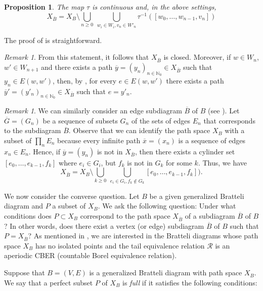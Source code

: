 \documentclass[11pt,reqno]{amsart}
\theoremstyle{definition}
\theoremstyle{remark}
\newtheorem{remark}[definition]{Remark}
\theoremstyle{plain}
\newtheorem{prop}[definition]{Proposition}
\def\ol{\overline}
\newcommand{\N}{\mathbb N}
\numberwithin{equation}{section}
\begin{document}
\begin{prop} \label{prop path space sbdgrm}
The map $\tau$ is continuous and, in the above settings,
$$
X_{\ol B} = X_B \setminus  \bigcup_{n \geq 0} \ 
\bigcup_{w_i \in W_i, v_n \in W'_n } \tau^{-1}( [w_0, \ldots, w_{n-1}, v_n]) 
$$
\end{prop}

The proof of  is straightforward.

\begin{remark}
 From this statement, it follows that $X_{\ol B}$ is closed. Moreover, if $w \in W_n$, $w' \in W_{n+1}$ and there exists a path $\ol y = (y_n)_{n \in \N_0} \in X_{\ol B}$ such that $y_n \in E(w, w')$, then, by , for every $e \in E(w, w')$ there exists a path $\ol y' = (y'_n)_{n \in \N_0} \in X_{\ol B}$ such that $e = y'_n$. 
\end{remark}

\begin{remark} We can similarly consider an edge subdiagram $\ol B$ of $B$ (see ). Let $\ol G = (G_n)$ be a sequence of subsets $G_n$ of the sets of
edges $E_n$ that corresponds to the subdiagram $\ol B$. Observe that we can identify the path space $X_B$ with a subset 
of $\prod_n E_n$ because every infinite path $\ol x = (x_n)$
is a sequence of edges $x_n \in E_n$. Hence, if $\ol y = (y_n)$ 
is not in 
$X_{\ol B}$, then there exists a cylinder set $[e_0, \ldots, e_{k-1}, f_k]$ where $e_i \in G_i$, but $f_k$ is not in $G_k$ for some $k$. 
Thus, we have  
$$
X_{\ol B} = X_B \setminus  \bigcup_{k \geq 0} \ 
\bigcup_{e_i \in G_i, f_k \notin G_k} [e_0, \ldots, e_{k-1}, f_k]). 
$$
\end{remark}

We now consider the converse question. Let $B$ be a given generalized Bratteli diagram and $P$ a subset of $X_B$. We ask the following question: Under what conditions does $P \subset X_B$ correspond to the path space $X_{\ol B}$ of a subdiagram $\ol B$ of $B$? In other words, does there exist a vertex (or edge) subdiagram $\ol B$ of $B$ such that $P = X_{\ol B}$? As mentioned in , we are interested in the Bratteli diagrams whose path space $X_B$ has no isolated points and the tail equivalence relation $\mathcal R$ is an aperiodic CBER (countable Borel equivalence relation).

Suppose that $B = (V, E)$ is a generalized Bratteli diagram with path space $X_B$. We say that a perfect subset $P$ of $X_B$ is \textit{full} if it satisfies the following conditions:
\end{document}

